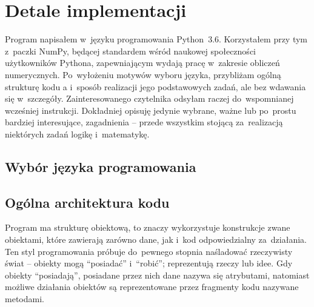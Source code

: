 \section{Detale implementacji}\label{tesliper:implementation}
Program \tesliper{} napisałem w~języku programowania Python~3.6.
Korzystałem przy tym z~paczki NumPy, będącej standardem wśród naukowej społeczności
  użytkowników Pythona, zapewniającym wydają pracę w~zakresie obliczeń numerycznych.
Po~wyłożeniu motywów wyboru języka, przybliżam ogólną strukturę kodu \tesliper{}a
  i~sposób realizacji jego podstawowych zadań, ale bez wdawania się w~szczegóły.
Zainteresowanego czytelnika odsyłam raczej do~wspomnianej wcześniej instrukcji.
Dokładniej opisuję jedynie wybrane, ważne lub po~prostu bardziej interesujące, zagadnienia
  \--- przede wszystkim stojącą za~realizacją niektórych zadań logikę i~matematykę.

\subsection{Wybór języka programowania}\label{implementation:language}
\subsection{Ogólna architektura kodu}\label{implementation:architecture}
Program \tesliper{} ma strukturę obiektową, to znaczy wykorzystuje konstrukcje zwane obiektami,
  które zawierają zarówno dane, jak i~kod odpowiedzialny za~działania.
Ten styl programowania próbuje do~pewnego stopnia naśladować rzeczywisty świat \---
  obiekty mogą \enquote{posiadać} i~\enquote{robić}; reprezentują rzeczy lub idee.
Gdy obiekty \enquote{posiadają}, posiadane przez nich dane nazywa się atrybutami,
  natomiast możliwe działania obiektów są reprezentowane przez fragmenty kodu nazywane metodami.

